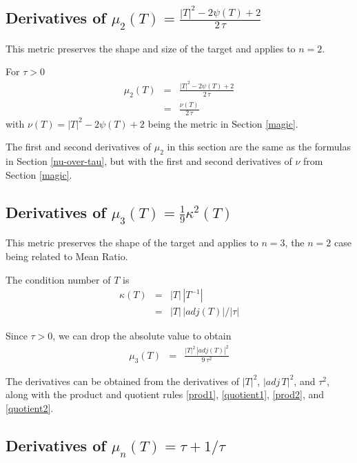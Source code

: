 \documentclass{report}
\begin{document}
\subsection{Derivatives of $\mu_2(T)=\frac{|T|^2-2 \psi(T)+2}{2 \, \tau}$}

\noindent This metric preserves the shape and size of the target and applies
to $n=2$. \newline

\noindent For $\tau>0$
\begin{eqnarray}
\mu_2(T) & = & \frac{|T|^2-2 \psi(T)+2}{2 \, \tau} \\
         & = & \frac{\nu(T)}{2 \, \tau}
\end{eqnarray}
with $\nu(T) = |T|^2 - 2 \psi(T) + 2$ being the metric in Section \ref{magic}. 
 \newline

\noindent The first and second derivatives of $\mu_2$ in this section are the 
same as the formulas in Section \ref{nu-over-tau}, but with the first and 
second derivatives of $\nu$ from Section \ref{magic}.  \newline

\subsection{Derivatives of $\mu_3(T)=\frac{1}{9} \kappa^2(T)$}

\noindent This metric preserves the shape of the target and applies
to $n=3$, the $n=2$ case being related to Mean Ratio. \newline

\noindent The condition number of $T$ is
\begin{eqnarray}
\kappa(T) & = & |T| \, |T^{-1}| \\
          & = & |T| \, |adj(T)| / |\tau|
\end{eqnarray}

\noindent Since $\tau>0$, we can drop the absolute value to obtain
\begin{eqnarray}
\mu_3(T) & = & \frac{|T|^2 \, |adj(T)|^2}{9 \, \tau^2}
\end{eqnarray}

\noindent The derivatives can be obtained from the derivatives of $|T|^2$,
$|adj \, T|^2$, and $\tau^2$, along with the product and quotient rules 
\ref{prod1}, \ref{quotient1}, \ref{prod2}, and \ref{quotient2}. \newline 

\subsection{Derivatives of $\mu_n(T)=\tau + 1/\tau$}
\end{document}
